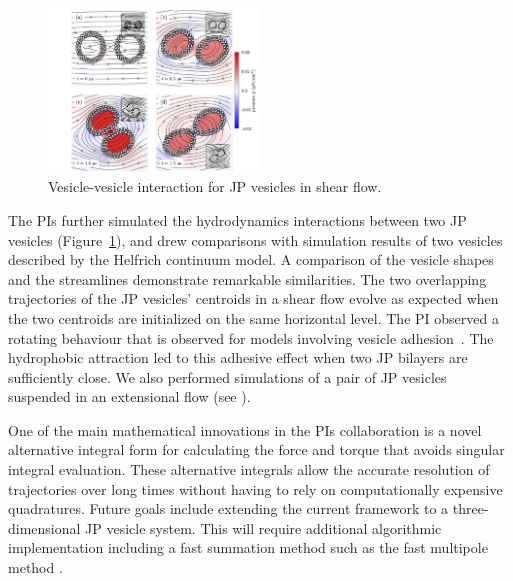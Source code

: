 \begin{figure}
\includegraphics[width=0.5\textwidth]{figures/ShearDoublet.jpg}
\caption{\label{fig:JPv_interactions} Vesicle-vesicle interaction for JP
  vesicles in shear flow.}
\end{figure}
The PIs further simulated the hydrodynamics interactions between two JP
vesicles (Figure~\ref{fig:JPv_interactions}), and drew comparisons with
simulation results of two vesicles described by the Helfrich continuum
model. A comparison of the vesicle shapes and the streamlines
demonstrate remarkable similarities. The two overlapping trajectories of
the JP vesicles' centroids in a shear flow evolve as expected when the
two centroids are initialized on the same horizontal level. The PI
observed a rotating behaviour that is observed for models involving
vesicle adhesion~\cite{qua-vee-you2019, abb-far-ezz-ben-mis2021}. The
hydrophobic attraction led to this adhesive effect when two JP bilayers
are sufficiently close. We also performed simulations of a pair
of JP vesicles suspended in an extensional flow (see \cite{FuQuRyYo20}).

One of the main mathematical innovations in the PIs collaboration is a
novel alternative integral form for calculating the force and torque
that avoids singular integral evaluation. These alternative integrals
allow the accurate resolution of trajectories over long times without
having to rely on computationally expensive quadratures. Future goals
include extending the current framework to a three-dimensional JP
vesicle system. This will require additional algorithmic implementation
including a fast summation method such as the fast multipole method \cite{Yan2019}.



